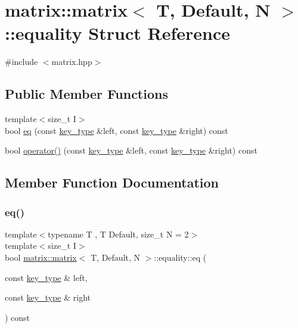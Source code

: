 \hypertarget{structmatrix_1_1matrix_1_1equality}{}\section{matrix\+:\+:matrix$<$ T, Default, N $>$\+:\+:equality Struct Reference}
\label{structmatrix_1_1matrix_1_1equality}


{\ttfamily \#include $<$matrix.\+hpp$>$}

\subsection*{Public Member Functions}
\begin{DoxyCompactItemize}
\item 
{\footnotesize template$<$size\+\_\+t I$>$ }\\bool \hyperlink{structmatrix_1_1matrix_1_1equality_ab58e41a8a28df2333dfcff3a3fa1ad84}{eq} (const \hyperlink{structmatrix_1_1matrix_af7b5498ac1b615cb9ef51bd185a2557e}{key\+\_\+type} \&left, const \hyperlink{structmatrix_1_1matrix_af7b5498ac1b615cb9ef51bd185a2557e}{key\+\_\+type} \&right) const
\item 
bool \hyperlink{structmatrix_1_1matrix_1_1equality_ac28cf4d42be01a4827c0c224dd105fd1}{operator()} (const \hyperlink{structmatrix_1_1matrix_af7b5498ac1b615cb9ef51bd185a2557e}{key\+\_\+type} \&left, const \hyperlink{structmatrix_1_1matrix_af7b5498ac1b615cb9ef51bd185a2557e}{key\+\_\+type} \&right) const
\end{DoxyCompactItemize}


\subsection{Member Function Documentation}
\mbox{\label{structmatrix_1_1matrix_1_1equality_ab58e41a8a28df2333dfcff3a3fa1ad84}} 
\subsubsection{\texorpdfstring{eq()}{eq()}}
{\footnotesize\ttfamily template$<$typename T , T Default, size\+\_\+t N = 2$>$ \\
template$<$size\+\_\+t I$>$ \\
bool \hyperlink{structmatrix_1_1matrix}{matrix\+::matrix}$<$ T, Default, N $>$\+::equality\+::eq (\begin{DoxyParamCaption}\item[{const \hyperlink{structmatrix_1_1matrix_af7b5498ac1b615cb9ef51bd185a2557e}{key\+\_\+type} \&}]{left,  }\item[{const \hyperlink{structmatrix_1_1matrix_af7b5498ac1b615cb9ef51bd185a2557e}{key\+\_\+type} \&}]{right }\end{DoxyParamCaption}) const\hspace{0.3cm}{\ttfamily [inline]}}

